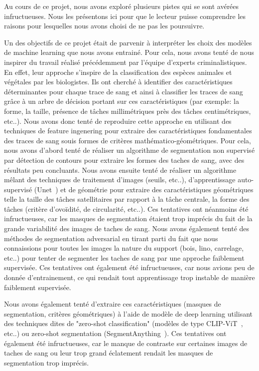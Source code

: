 Au cours de ce projet, nous avons exploré plusieurs pistes qui se sont avérées infructueuses. Nous les présentons ici pour que le lecteur puisse comprendre les raisons pour lesquelles nous avons choisi de ne pas les poursuivre.

Un des objectifs de ce projet était de parvenir à interpréter les choix des modèles de machine learning que nous avons entrainé.
Pour cela, nous avons tenté de nous inspirer du travail réalisé précédemment par l'équipe d'experts criminalistiques. En effet,
leur approche s'inspire de la classification des espèces animales et végétales par les biologistes. Ils ont cherché à identifier des caractéristiques
déterminantes pour chaque trace de sang et ainsi à classifier les traces de sang grâce à un arbre de décision
portant sur ces caractéristiques (par exemple: la forme, la taille, présence de tâches millimétriques près des tâches centimétriques, etc..).
Nous avons donc tenté de reproduire cette approche en utilisant des techniques de feature ingenering pour extraire des caractéristiques
fondamentales des traces de sang souis formes de critères mathématico-géométriques. Pour cela, nous avons d'abord tenté de réaliser
un algorithme de segmentation non supervisé par détection de contours pour extraire les formes des taches de sang, avec des résultats peu concluants. Nous avons ensuite
tenté de réaliser un algorithme mêlant des techniques de traitement d'images (seuils, etc..), d'apprentissage auto-supervisé (Unet~\cite{UNet}) et de géométrie pour extraire des caractéristiques géométriques telle la taille
des tâches satellitaires par rapport à la tâche centrale, la forme des tâches (critère d'ovoïdité, de circularité, etc..). Ces tentatives ont néanmoins
été infructueuses, car les masques de segmentation étaient trop imprécis du fait de la grande variabilité des images de taches de sang. Nous avons également tenté des méthodes de segmentation
adversarial en tirant parti du fait que nous connaissions pour toutes les images la nature du support (bois, lino, carrelage, etc..) pour tenter de segmenter les taches de sang par une approche faiblement supervisée. Ces tentatives ont également été infructueuses, car nous 
avions peu de donnée d'entrainement, ce qui rendait tout apprentissage trop instable de manière faiblement supervisée.

Nous avons également tenté d'extraire ces caractéristiques (masques de segmentation, critères géométriques) à l'aide de modèle de deep learning
utilisant des techniques dites de "zero-shot classification" (modèles de type CLIP-ViT~\cite{CLip}, etc..) ou zero-shot segmentation (SegmentAnything~\cite{SegmentAnything}). Ces tentatives ont également été infructueuses, car le manque de contraste
sur certaines images de taches de sang ou leur trop grand éclatement rendait les masques de segmentation trop imprécis.



